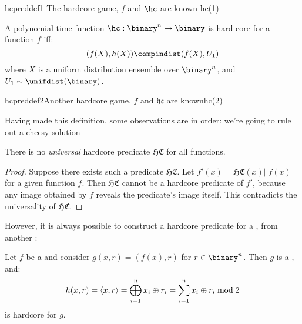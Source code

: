 \begin{cryptogame}
    {hcpreddef1}
    {The hardcore game, $f$ and $\hc$ are known}
    {hc(1)}

\end{cryptogame}

\begin{definition}
    A polynomial time function $\hc : \binary^n \to \binary$ is hard-core for a function $f$ iff:
    \[
        (f(X), h(X)) \compindist (f(X), U_1)
    \]
    where $X$ is a uniform distribution ensemble over $\binary^n$, and $U_1 \sim \unifdist(\binary)$.
\end{definition}


\begin{cryptogame}{hcpreddef2}{Another hardcore game, $f$ and $\mathfrak{hc}$ are known}{hc(2)}
    \cseqdelay

    \cseqdelay
    \cseqdelay

\end{cryptogame}


Having made this definition, some observations are in order: we're going to rule out a cheesy solution

\begin{claim}
    There is no \textit{universal} hardcore predicate $\mathfrak{HC}$ for all functions.
\end{claim}

\begin{proof}
    Suppose there exists such a predicate $\mathfrak{HC}$. Let $f'(x) = \mathfrak{HC}(x) || f(x)$ for a given function $f$. Then $\mathfrak{HC}$ cannot be a hardcore predicate of $f'$, because any image obtained by $f$ reveals the predicate's image itself. This contradicts the universality of $\mathfrak{HC}$.
\end{proof}

However, it is always possible to construct a hardcore predicate for a \owf{}, from another \owf:

\begin{theorem}
    Let $f$ be a \owf{} and consider $g(x, r) = (f(x), r)$ for $r \in \binary^n$. Then $g$ is a \owf{}, and:
    \[
        h(x,r) = \left<x, r\right> = \bigoplus_{i = 1}^n x_i \oplus r_i = \sum_{i = 1}^n x_i \oplus r_i \mathrel{\textup{mod}} 2
    \]
    is hardcore for $g$.
\end{theorem}

